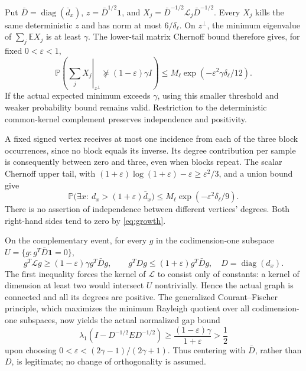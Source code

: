\documentclass[11pt,letterpaper]{article}
\newcommand{\E}{\mathbb E}
\newcommand{\Prob}{\mathbb P}
\newcommand{\one}{\mathbf 1}
\newcommand{\diag}{\operatorname{diag}}
\begin{document}
Put $\bar D=\diag(\bar d_x)$, $z=\bar D^{1/2}\one$, and
$X_j=\bar D^{-1/2}\mathcal L_j\bar D^{-1/2}$. Every $X_j$ kills the same deterministic $z$ and has norm at most $6/\delta_\ell$. On $z^\perp$, the minimum eigenvalue of $\sum_j\E X_j$ is at least $\gamma$. The lower-tail matrix Chernoff bound \cite[Corollary 5.2, Remark 5.3]{tropp} therefore gives, for fixed $0<\varepsilon<1$,
\begin{equation}\label{eq:chernoff}
 \Prob\left(\left.\sum_jX_j\right|_{z^\perp}
       \not\succeq(1-\varepsilon)\gamma I\right)
 \leq M_\ell\exp(-\varepsilon^2\gamma\delta_\ell/12).
\end{equation}
If the actual expected minimum exceeds $\gamma$, using this smaller threshold and weaker probability bound remains valid. Restriction to the deterministic common-kernel complement preserves independence and positivity.

A fixed signed vertex receives at most one incidence from each of the three block occurrences, since no block equals its inverse. Its degree contribution per sample is consequently between zero and three, even when blocks repeat. The scalar Chernoff upper tail, with
$(1+\varepsilon)\log(1+\varepsilon)-\varepsilon\geq\varepsilon^2/3$, and a union bound give
\begin{equation}\label{eq:degreesrandom}
 \Prob\bigl(\exists x:\ d_x>(1+\varepsilon)\bar d_x\bigr)
 \leq M_\ell\exp(-\varepsilon^2\delta_\ell/9).
\end{equation}
There is no assertion of independence between different vertices' degrees. Both right-hand sides tend to zero by \eqref{eq:growth}.

On the complementary event, for every $g$ in the codimension-one subspace $U=\{g:g^T\bar D\one=0\}$,
\[
 g^T\mathcal Lg\geq(1-\varepsilon)\gamma g^T\bar Dg,
 \qquad g^TDg\leq(1+\varepsilon)g^T\bar Dg,
 \quad D=\diag(d_x).
\]
The first inequality forces the kernel of $\mathcal L$ to consist only of constants: a kernel of dimension at least two would intersect $U$ nontrivially. Hence the actual graph is connected and all its degrees are positive. The generalized Courant--Fischer principle, which maximizes the minimum Rayleigh quotient over all codimension-one subspaces, now yields the actual normalized gap bound
\begin{equation}\label{eq:actualgap}
 \lambda_1(I-D^{-1/2}ED^{-1/2})
 \geq\frac{(1-\varepsilon)\gamma}{1+\varepsilon}>\frac12
\end{equation}
upon choosing $0<\varepsilon<(2\gamma-1)/(2\gamma+1)$. Thus centering with $\bar D$, rather than $D$, is legitimate; no change of orthogonality is assumed.
\end{document}
